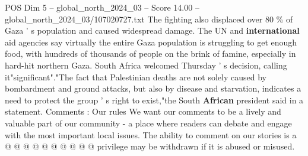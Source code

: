 \begin{textsample}{POS Dim 5 – global\_north\_2024\_03 – Score 14.00 – global\_north\_2024\_03/107020727.txt}
The fighting also displaced over 80 \% of Gaza ' s population and caused widespread damage.
The UN and \textbf{international} aid agencies say virtually the entire Gaza population is struggling to get enough food, with hundreds of thousands of people on the brink of famine, especially in hard-hit northern Gaza.
South Africa welcomed Thursday ' s decision, calling it"significant"."The fact that Palestinian deaths are not solely caused by bombardment and ground attacks, but also by disease and starvation, indicates a need to protect the group ' s right to exist,"the South \textbf{African} president said in a statement.
Comments : Our rules We want our comments to be a lively and valuable part of our community - a place where readers can debate and engage with the most important local issues.
The ability to comment on our stories is a @ @ @ @ @ @ @ @ @ @ privilege may be withdrawn if it is abused or misused.

\end{textsample}
